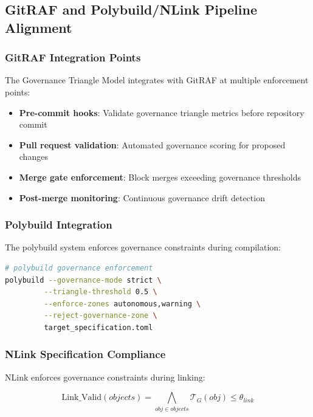 \subsection{GitRAF and Polybuild/NLink Pipeline Alignment}

\subsubsection{GitRAF Integration Points}

The Governance Triangle Model integrates with GitRAF at multiple enforcement points:

\begin{itemize}
    \item \textbf{Pre-commit hooks}: Validate governance triangle metrics before repository commit
    \item \textbf{Pull request validation}: Automated governance scoring for proposed changes
    \item \textbf{Merge gate enforcement}: Block merges exceeding governance thresholds
    \item \textbf{Post-merge monitoring}: Continuous governance drift detection
\end{itemize}

\subsubsection{Polybuild Integration}

The polybuild system enforces governance constraints during compilation:

\begin{lstlisting}[language=bash, caption=Polybuild Governance Integration]
# polybuild governance enforcement
polybuild --governance-mode strict \
         --triangle-threshold 0.5 \
         --enforce-zones autonomous,warning \
         --reject-governance-zone \
         target_specification.toml
\end{lstlisting}

\subsubsection{NLink Specification Compliance}

NLink enforces governance constraints during linking:

\begin{equation}
\text{Link\_Valid}(objects) = \bigwedge_{obj \in objects} \mathcal{T}_G(obj) \leq \theta_{link}
\end{equation}

